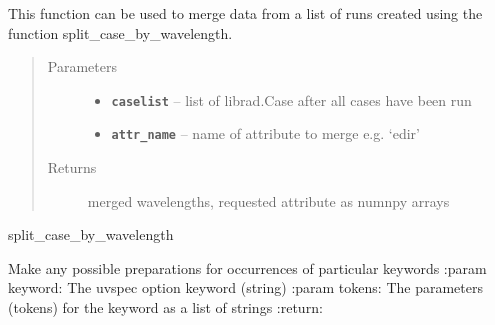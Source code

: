\documentclass[a4paper,10pt,english]{sphinxmanual}
\begin{document}
\begin{fulllineitems}
\begin{fulllineitems}
This function can be used to merge data from a list of runs created using the function
split\_case\_by\_wavelength.
\begin{quote}\begin{description}
\item[{Parameters}] \leavevmode\begin{itemize}
\item {} 
\textbf{\texttt{caselist}} -- list of librad.Case after all cases have been run

\item {} 
\textbf{\texttt{attr\_name}} -- name of attribute to merge e.g. `edir'

\end{itemize}

\item[{Returns}] \leavevmode
merged wavelengths, requested attribute as numnpy arrays

\end{description}\end{quote}




split\_case\_by\_wavelength



\end{fulllineitems}


\begin{fulllineitems}
\label{packages:librad.Case.prepare_for_keyword}
Make any possible preparations for occurrences of particular keywords
:param keyword: The uvspec option keyword (string)
:param tokens: The parameters (tokens) for the keyword as a list of strings
:return:

\end{fulllineitems}



\end{fulllineitems}
\end{document}
